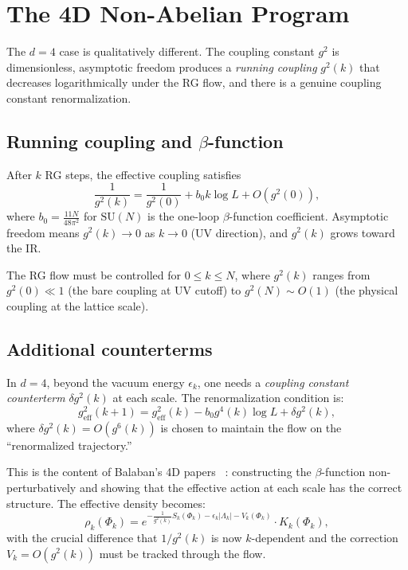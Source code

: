 \documentclass[11pt,a4paper]{article}
\theoremstyle{plain}
\theoremstyle{definition}
\theoremstyle{remark}
\newcommand{\SU}{\mathrm{SU}}
\begin{document}
\section{The 4D Non-Abelian Program}\label{sec:ym4}

The $d = 4$ case is qualitatively different.
The coupling constant $g^2$ is dimensionless,
asymptotic freedom produces a \emph{running coupling}
$g^2(k)$ that decreases logarithmically under the
RG flow, and there is a genuine coupling constant
renormalization.

\subsection{Running coupling and $\beta$-function}

After $k$ RG steps, the effective coupling satisfies
\begin{equation}\label{eq:running_coupling}
  \frac{1}{g^2(k)} = \frac{1}{g^2(0)} + b_0 k \log L
  + O(g^2(0)),
\end{equation}
where $b_0 = \frac{11N}{48\pi^2}$ for $\SU(N)$
is the one-loop $\beta$-function coefficient.
Asymptotic freedom means $g^2(k) \to 0$ as
$k \to 0$ (UV direction), and $g^2(k)$ grows
toward the IR.

The RG flow must be controlled for $0 \le k \le N$,
where $g^2(k)$ ranges from $g^2(0) \ll 1$
(the bare coupling at UV cutoff) to $g^2(N) \sim O(1)$
(the physical coupling at the lattice scale).

\subsection{Additional counterterms}

In $d = 4$, beyond the vacuum energy $\epsilon_k$,
one needs a \emph{coupling constant counterterm}
$\delta g^2(k)$ at each scale. The renormalization
condition is:
\begin{equation}\label{eq:renorm_condition}
  g^2_{\text{eff}}(k+1) = g^2_{\text{eff}}(k)
  - b_0 g^4(k) \log L + \delta g^2(k),
\end{equation}
where $\delta g^2(k) = O(g^6(k))$ is chosen to
maintain the flow on the ``renormalized trajectory.''

This is the content of Balaban's 4D papers~%
\cite{Bal87,Bal88a,Bal88b,Bal89}: constructing the
$\beta$-function non-perturbatively and showing that
the effective action at each scale has the correct
structure. The effective density becomes:
\begin{equation}\label{eq:effective_density_4d}
  \rho_k(\Phi_k) = e^{-\frac{1}{g^2(k)} S_k(\Phi_k)
  - \epsilon_k |\Lambda_k| - V_k(\Phi_k)}
  \cdot K_k(\Phi_k),
\end{equation}
with the crucial difference that $1/g^2(k)$ is now
$k$-dependent and the correction $V_k = O(g^2(k))$
must be tracked through the flow.
\end{document}
